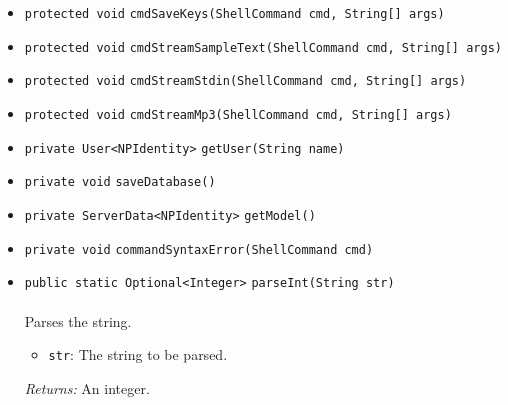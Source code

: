 \begin{itemize}
\item \lstinline|protected void| \lstinline|cmdSaveKeys|\lstinline|(ShellCommand cmd, String[] args)| \\[-0.6em]




\item \lstinline|protected void| \lstinline|cmdStreamSampleText|\lstinline|(ShellCommand cmd, String[] args)| \\[-0.6em]




\item \lstinline|protected void| \lstinline|cmdStreamStdin|\lstinline|(ShellCommand cmd, String[] args)| \\[-0.6em]




\item \lstinline|protected void| \lstinline|cmdStreamMp3|\lstinline|(ShellCommand cmd, String[] args)| \\[-0.6em]




\item \lstinline|private User<NPIdentity>| \lstinline|getUser|\lstinline|(String name)| \\[-0.6em]




\item \lstinline|private void| \lstinline|saveDatabase|\lstinline|()| \\[-0.6em]




\item \lstinline|private ServerData<NPIdentity>| \lstinline|getModel|\lstinline|()| \\[-0.6em]




\item \lstinline|private void| \lstinline|commandSyntaxError|\lstinline|(ShellCommand cmd)| \\[-0.6em]




\item \lstinline|public static Optional<Integer>| \lstinline|parseInt|\lstinline|(String str)|\\ \\[-0.6em]
Parses the string.
\begin{itemize}
\item \lstinline|str|: The string to be parsed.
\end{itemize}

\emph{Returns:} An integer.

\end{itemize}

